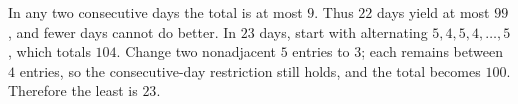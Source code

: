 In any two consecutive days the total is at most $9$. Thus $22$ days yield at most $99$, and fewer days cannot do better. In $23$ days, start with alternating $5,4,5,4,\ldots,5$, which totals $104$. Change two nonadjacent $5$ entries to $3$; each remains between $4$ entries, so the consecutive-day restriction still holds, and the total becomes $100$. Therefore the least is $\boxed{23}$.
